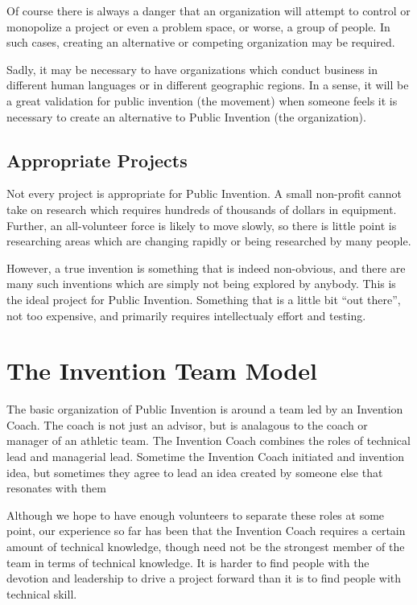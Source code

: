 \documentclass[
	fontsize=10pt, %
	twoside=false, %
	secnumdepth=1, %
]{kaobook}
\begin{document}
Of course there is always a danger that an organization will attempt to control or monopolize
a project or even a problem space, or worse, a group of people.
In such cases, creating an alternative or competing organization
may be required.

Sadly, it may be necessary to have organizations which conduct business in
different human languages or in different geographic regions.
In a sense, it will be a great validation for public invention (the movement) when
someone feels it is necessary to create an alternative to Public Invention (the organization).

\section{Appropriate Projects}

Not every project is appropriate for Public Invention.
A small non-profit cannot take on research which requires hundreds of thousands of dollars
in equipment. Further, an all-volunteer force is likely to move slowly, so there
is little point is researching areas which are changing rapidly or being
researched by many people.


However, a true invention is something that is indeed non-obvious, and there
are many such inventions which are simply not being explored by anybody.
This is the ideal project for Public Invention. Something that is a
little bit ``out there'', not too expensive, and primarily requires
intellectualy effort and testing.


\chapter{The Invention Team Model}

The basic organization of Public Invention is around
a team led by an Invention Coach.
The coach is not just an advisor, but
is analagous to the coach or manager of an athletic team.
The Invention Coach combines the roles of technical lead
and managerial lead.
Sometime the Invention Coach initiated and invention idea,
but sometimes they agree to lead an idea created by someone else that resonates
with them

Although we hope to have enough volunteers to separate these
roles at some point, our experience so far has been that
the Invention Coach requires a certain amount of technical
knowledge, though need not be the strongest member of the
team in terms of technical knowledge.
It is harder to find people with the devotion and leadership
to drive a project forward than it is to find people with
technical skill.
\end{document}
